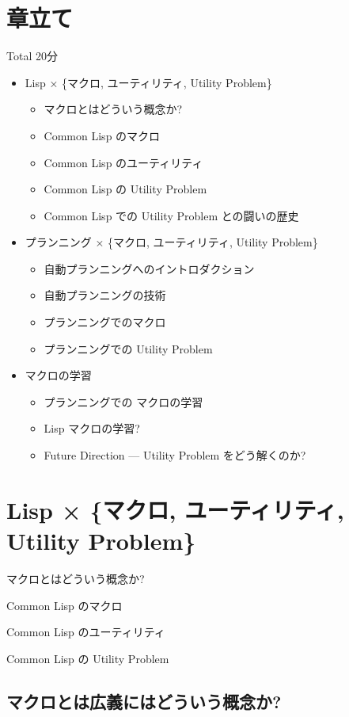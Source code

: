 \section{章立て}
\label{sec-1}

Total 20分

\begin{itemize}
\item Lisp × \{マクロ, ユーティリティ, Utility Problem\}
\begin{itemize}
\item マクロとはどういう概念か?
\item Common Lisp のマクロ
\item Common Lisp のユーティリティ
\item Common Lisp の Utility Problem
\item Common Lisp での Utility Problem との闘いの歴史
\end{itemize}
\item プランニング × \{マクロ, ユーティリティ, Utility Problem\}
\begin{itemize}
\item 自動プランニングへのイントロダクション
\item 自動プランニングの技術
\item プランニングでのマクロ
\item プランニングでの Utility Problem
\end{itemize}
\item マクロの学習
\begin{itemize}
\item プランニングでの マクロの学習
\item Lisp マクロの学習?
\item Future Direction --- Utility Problem をどう解くのか?
\end{itemize}
\end{itemize}

\section{Lisp × \{マクロ, ユーティリティ, Utility Problem\}}
\label{sec-2}

マクロとはどういう概念か?

Common Lisp のマクロ

Common Lisp のユーティリティ

Common Lisp の Utility Problem

\subsection{マクロとは広義にはどういう概念か?}
\label{sec-2-1}

